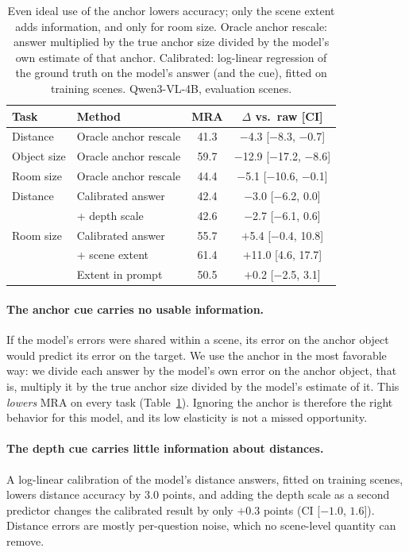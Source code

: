 \documentclass[letterpaper]{article} %
\begin{document}
\begin{table}[t]
\centering
\small
\setlength{\tabcolsep}{2pt}
\begin{tabular}{llcc}
\toprule
Task & Method & MRA & $\Delta$ vs.\ raw [CI] \\
\midrule
Distance & Oracle anchor rescale & 41.3 & $-$4.3 [$-$8.3, $-$0.7] \\
Object size & Oracle anchor rescale & 59.7 & $-$12.9 [$-$17.2, $-$8.6] \\
Room size & Oracle anchor rescale & 44.4 & $-$5.1 [$-$10.6, $-$0.1] \\
\midrule
Distance & Calibrated answer & 42.4 & $-$3.0 [$-$6.2, 0.0] \\
 & + depth scale & 42.6 & $-$2.7 [$-$6.1, 0.6] \\
Room size & Calibrated answer & 55.7 & $+$5.4 [$-$0.4, 10.8] \\
 & + scene extent & 61.4 & $+$11.0 [4.6, 17.7] \\
 & Extent in prompt & 50.5 & $+$0.2 [$-$2.5, 3.1] \\
\bottomrule
\end{tabular}
\caption{Even ideal use of the anchor lowers accuracy; only the scene extent adds information, and only for room size. Oracle anchor rescale: answer multiplied by the true anchor size divided by the model's own estimate of that anchor. Calibrated: log-linear regression of the ground truth on the model's answer (and the cue), fitted on training scenes. Qwen3-VL-4B, evaluation scenes.}
\label{tab:headroom}
\end{table}

\paragraph{The anchor cue carries no usable information.}
If the model's errors were shared within a scene, its error on the anchor object would predict its error on the target. We use the anchor in the most favorable way: we divide each answer by the model's own error on the anchor object, that is, multiply it by the true anchor size divided by the model's estimate of it. This \emph{lowers} MRA on every task (Table~\ref{tab:headroom}). Ignoring the anchor is therefore the right behavior for this model, and its low elasticity is not a missed opportunity.

\paragraph{The depth cue carries little information about distances.}
A log-linear calibration of the model's distance answers, fitted on training scenes, lowers distance accuracy by 3.0 points, and adding the depth scale as a second predictor changes the calibrated result by only $+0.3$ points (CI [$-1.0$, $1.6$]). Distance errors are mostly per-question noise, which no scene-level quantity can remove.
\end{document}
